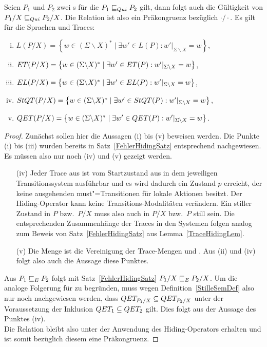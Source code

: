 \begin{Satz}
  \label{StilleHidingSatz}
  Seien $P_1$ und $P_2$ zwei \MEIO{}s für die $P_1 \sqsubseteq  _{Qui} P_2$ gilt, dann folgt
  auch die Gültigkeit von $P_1/X \sqsubseteq  _{Qui} P_2/X$. Die Relation \QRel{} ist also ein
  Präkongruenz bezüglich $\cdot /\cdot$. Es gilt für die Sprachen und Traces:
  \begin{enumerate}[(i)]
    \item $L(P/X) = \left\{w\in (\Sigma\backslash X)^*\mid \exists w'\in L(P):
      w'|_{\Sigma\backslash X} = w\right\}$,
    \item $ET (P/X) = \left\{w\in (\Sigma\backslash X)^*\mid \exists w'\in
      ET(P): w'|_{\Sigma\backslash X} = w\right\}$,
    \item $EL (P/X) = \left\{w\in (\Sigma\backslash X)^*\mid \exists w'\in
      EL(P): w'|_{\Sigma\backslash X} = w\right\}$,
    \item $StQT (P/X) = \left\{w\in (\Sigma\backslash X)^*\mid \exists w'\in
      StQT(P): w'|_{\Sigma\backslash X} = w\right\}$,
    \item $QET (P/X) = \left\{w\in (\Sigma\backslash X)^*\mid \exists w'\in
      QET(P): w'|_{\Sigma\backslash X} = w\right\}$.
  \end{enumerate}
\end{Satz}
\begin{proof}
  Zunächst sollen hier die Aussagen (i) bis (v) beweisen werden. Die Punkte
  (i) bis (iii) wurden bereits in Satz~\ref{FehlerHidingSatz} entsprechend
  nachgewiesen. Es müssen also nur noch (iv) und (v) gezeigt werden.
  \begin{itemize}
    \item[(iv)] Jeder Trace aus \StQT{} ist vom Startzustand aus in dem
      jeweiligen Transitionssystem ausführbar und es wird dadurch ein Zustand
      $p$ erreicht, der keine ausgehenden must"=Transitionen für lokale
      Aktionen besitzt. Der Hiding-Operator kann keine Transitions-Modalitäten
      verändern. Ein stiller Zustand in $P$ bzw.\ $P/X$ muss also auch in $P/X$
      bzw.\ $P$ still sein. Die entsprechenden Zusammenhänge der Traces in den
      Systemen folgen analog zum Beweis von Satz~\ref{FehlerHidingSatz} aus
      Lemma~\ref{TraceHidingLem}.
    \item[(v)] Die Menge \QET{} ist die Vereinigung der Trace-Mengen \ET{} und
      \StQT{}. Aus (ii) und (iv) folgt also auch die Aussage diese Punktes.
  \end{itemize}
  Aus $P_1 \sqsubseteq  _E P_2$ folgt mit Satz~\ref{FehlerHidingSatz} $P_1/X \sqsubseteq  _E P_2/X$.
  Um die analoge Folgerung für \QRel{} zu begründen, muss wegen
  Definition~\ref{StilleSemDef} also nur noch nachgewiesen werden, dass $QET
  _{P_1/X} \subseteq QET _{P_2/X}$ unter der Voraussetzung der Inklusion $QET
  _1 \subseteq QET _2$ gilt. Dies folgt aus der Aussage des Punktes (iv).\\
  Die Relation \QRel{} bleibt also unter der Anwendung des Hiding-Operators
  erhalten und ist somit bezüglich diesem eine Präkongruenz.
\end{proof}

